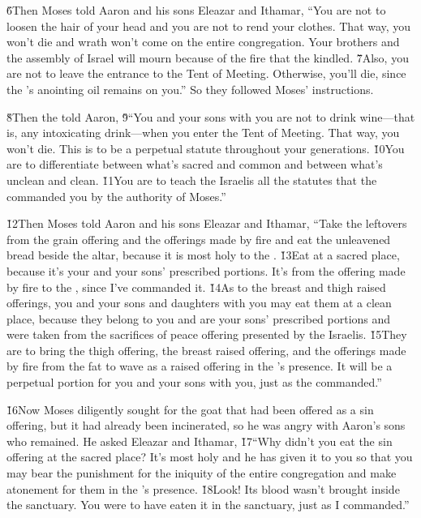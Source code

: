 \v{6}Then Moses told Aaron and his sons Eleazar and Ithamar, ``You are not to loosen the hair of your head and you are not to rend your clothes. That way, you won't die and wrath won't come on the entire congregation. Your brothers and the assembly of Israel will mourn because of the fire that the  kindled. \v{7}Also, you are not to leave the entrance to the Tent of Meeting. Otherwise, you'll die, since the 's anointing oil remains on you.'' So they followed Moses' instructions.

\v{8}Then the  told Aaron, \v{9}``You and your sons with you are not to drink wine---that is, any intoxicating drink---when you enter the Tent of Meeting. That way, you won't die. This is to be a perpetual statute throughout your generations. \v{10}You are to differentiate between what's sacred and common and between what's unclean and clean. \v{11}You are to teach the Israelis all the statutes that the  commanded you by the authority of Moses.''

\v{12}Then Moses told Aaron and his sons Eleazar and Ithamar, ``Take the leftovers from the grain offering and the offerings made by fire and eat the unleavened bread beside the altar, because it is most holy to the . \v{13}Eat at a sacred place, because it's your and your sons' prescribed portions. It's from the offering made by fire to the , since I've commanded it. \v{14}As to the breast and thigh raised offerings, you and your sons and daughters with you may eat them at a clean place, because they belong to you and are your sons' prescribed portions and were taken from the sacrifices of peace offering presented by the Israelis. \v{15}They are to bring the thigh offering, the breast raised offering, and the offerings made by fire from the fat to wave as a raised offering in the 's presence. It will be a perpetual portion for you and your sons with you, just as the  commanded.''

\v{16}Now Moses diligently sought for the goat that had been offered as a sin offering, but it had already been incinerated, so he was angry with Aaron's sons who remained. He asked Eleazar and Ithamar, \v{17}``Why didn't you eat the sin offering at the sacred place? It's most holy and he has given it to you so that you may bear the punishment for the iniquity of the entire congregation and make atonement for them in the 's presence. \v{18}Look! Its blood wasn't brought inside the sanctuary. You were to have eaten it in the sanctuary, just as I commanded.''

